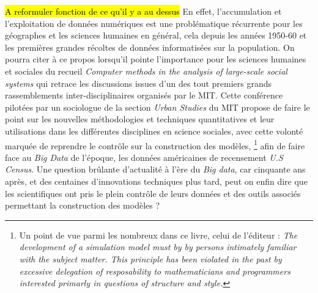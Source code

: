 \hl{A reformuler fonction de ce qu'il y a au dessus}
En effet, l'accumulation et l'exploitation de données numériques est une problématique récurrente pour les géographes et les sciences humaines en général, cela depuis les années 1950-60 \autocite{Kao1963, Hagerstrand1967b} \autocite[386]{Barnes2011} et les premières grandes récoltes de données informatisées sur la population. On pourra citer à ce propos \textcite{Gullahorn1966} lorsqu'il pointe l'importance pour les sciences humaines et sociales du recueil \textit{Computer methods in the analysis of large-scale social systems} qui retrace les discussions issues d'un des tout premiers grands rassemblements inter-disciplinaires organisés par le MIT. Cette conférence pilotées par un sociologue de la section \textit{Urban Studies} du MIT \autocite{Beshers1965} propose de faire le point sur les nouvelles méthodologies et techniques quantitatives et leur utilisations dans les différentes disciplines en science sociales, avec cette volonté marquée de reprendre le contrôle sur la construction des modèles, \footnote{Un point de vue parmi les nombreux dans ce livre, celui de l'éditeur \textcite[194]{Beshers1965} : \textit{The development of a simulation model must by by persons intimately familiar with the subject matter. This principle has been violated in the past by excessive delegation of resposability to mathematicians and programmers interested primarly in questions of structure and style.} }  afin de faire face au \textit{Big Data} de l'époque, les données américaines de recensement \textit{U.S Census}. Une question brûlante d'actualité à l'ère du \textit{Big data}, car cinquante ans après, et des centaines d'innovations techniques plus tard, peut on enfin dire que les scientifiques ont pris le plein contrôle de leurs données et des outils associés permettant la construction des modèles ?

